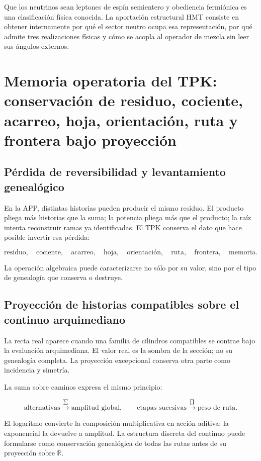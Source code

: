 Que los neutrinos sean leptones de espín semientero y obediencia fermiónica es una clasificación física conocida. La aportación estructural HMT consiste en obtener internamente por qué el sector neutro ocupa esa representación, por qué admite tres realizaciones físicas y cómo se acopla al operador de mezcla sin leer sus ángulos externos.


\section{Memoria operatoria del TPK: conservación de residuo, cociente, acarreo, hoja, orientación, ruta y frontera bajo proyección}

\subsection{Pérdida de reversibilidad y levantamiento genealógico}

En la APP, distintas historias pueden producir el mismo residuo. El producto pliega más historias que la suma; la potencia pliega más que el producto; la raíz intenta reconstruir ramas ya identificadas. El TPK conserva el dato que hace posible invertir esa pérdida:

\[
\text{residuo},\quad
\text{cociente},\quad
\text{acarreo},\quad
\text{hoja},\quad
\text{orientación},\quad
\text{ruta},\quad
\text{frontera},\quad
\text{memoria}.
\]

La operación algebraica puede caracterizarse no sólo por su valor, sino por el tipo de genealogía que conserva o destruye.

\subsection{Proyección de historias compatibles sobre el continuo arquimediano}

La recta real aparece cuando una familia de cilindros compatibles se contrae bajo la evaluación arquimediana. El valor real es la sombra de la sección; no su genealogía completa. La proyección excepcional conserva otra parte como incidencia y simetría.

La suma sobre caminos expresa el mismo principio:

\[
\text{alternativas}\xrightarrow{\sum}\text{amplitud global},
\qquad
\text{etapas sucesivas}\xrightarrow{\prod}\text{peso de ruta}.
\]

El logaritmo convierte la composición multiplicativa en acción aditiva; la exponencial la devuelve a amplitud. La estructura discreta del continuo puede formularse como conservación genealógica de todas las rutas antes de su proyección sobre \(\mathbb R\).

